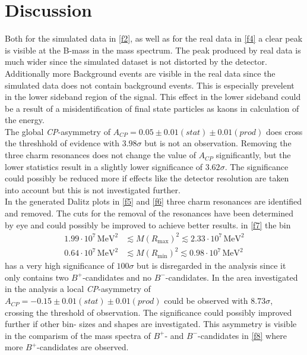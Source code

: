 \section{Discussion}
\label{sec:Diskussion}
Both for the simulated data in \autoref{f2}, as well as for the real data in \autoref{f4} a clear peak is visible at the B-mass in the
mass spectrum. The peak produced by real data is much wider since the simulated dataset is not distorted by the detector. Additionally
more Background events are visible in the real data since the simulated data does not contain background events. This is especially
prevelent in the lower sideband region of the signal. This effect in the lower sideband could be a result of a misidentification of final state
particles as kaons in calculation of the energy. \\
The global \textit{CP}-asymmetry of $A_\textit{CP} = 0.05 \pm 0.01 (stat) \pm 0.01 (prod)$ does cross the threshhold of evidence with $3.98 \sigma$
but is not an observation.
Removing the three charm resonances does not change the value of $A_\textit{CP}$ significantly, but the lower statistics result in a slightly lower significance of $3.62 \sigma$.
The significance could possibly be reduced more if effects like the detector resolution are taken into account but this is not investigated further. \\
In the generated Dalitz plots in \autoref{f5} and \ref{f6} three charm resonances are identified and removed. The cuts for the
removal of the resonances have been determined by eye and could possibly be improved to achieve better results.
in \autoref{f7} the bin
\begin{align*}
    1.99 \cdot 10^{7} \, \si{\mega\eV\squared} &\lesssim M(R_\text{max})^2 \lesssim 2.33 \cdot 10^{7} \, \si{\mega\eV\squared} \\
    0.64 \cdot 10^{7} \, \si{\mega\eV\squared} &\lesssim M(R_\text{min})^2 \lesssim 0.98 \cdot 10^{7} \, \si{\mega\eV\squared}
\end{align*}
has a very high significance of $100 \sigma$ but is disregarded in the analysis since it only contains two $B^+$-candidates and no $B^-$-candidates.
In the area investigated in the analysis a local \textit{CP}-asymmetry of $A_\textit{CP} = -0.15  \pm 0.01  (stat)  \pm 0.01(prod)$ could be observed
with $8.73 \sigma$, crossing the threshold of observation. The significance could possibly improved further if other bin- sizes and shapes are
investigated. This asymmetry is visible in the comparism of the mass spectra of $B^+$- and $B^-$-candidates in \autoref{f8} where more
$B^+$-candidates are observed.
